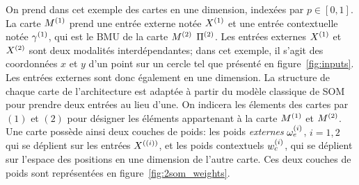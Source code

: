 On prend dans cet exemple des cartes en une dimension, indexées par $p \in [0,1]$.
La carte $M^{({1})}$ prend une entrée externe notée $X^{({1})}$ et une entrée contextuelle notée $\gamma^{({1})}$, qui est le BMU de la carte $M^{({2})}$ $\Pi^{({2})}$. Les entrées externes $X^{({1})}$ et $X^{({2})}$ sont deux modalités interdépendantes; dans cet exemple, il s'agit des coordonnées $x$ et $y$ d'un point sur un cercle tel que présenté en figure~\ref{fig:inputs}. Les entrées externes sont donc également en une dimension.
La structure de chaque carte de l'architecture est adaptée à partir du modèle classique de SOM pour prendre deux entrées au lieu d'une. On indicera les élements des cartes par $(1)$ et $(2)$ pour désigner les éléments appartenant à la carte $M^{({1})}$ et $M^{({2})}$.
Une carte possède ainsi deux couches de poids: les poids \emph{externes} $\omega_e^{({i})}$, $i=1,2$ qui se déplient sur les entrées $X^{({(i)})}$, et les poids contextuels $w_c^{({i})}$, qui se déplient sur l'espace des positions en une dimension de l'autre carte. Ces deux couches de poids sont représentées en figure~\ref{fig:2som_weights}.

